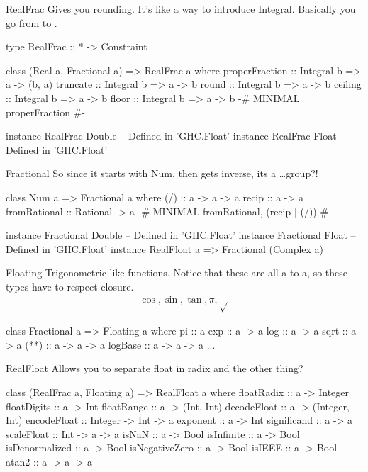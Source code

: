 \documentclass[openany, 11pt]{book}
\begin{document}
\begin{intuition}{RealFrac}{}
	Gives you rounding. It's like a way to introduce Integral.
	Basically you go from  to .
	\begin{haskell}{}
type RealFrac :: * -> Constraint

class (Real a, Fractional a) => RealFrac a where
    properFraction :: Integral b => a -> (b, a)
    truncate :: Integral b => a -> b
    round :: Integral b => a -> b
    ceiling :: Integral b => a -> b
    floor :: Integral b => a -> b
    {-# MINIMAL properFraction #-}

instance RealFrac Double -- Defined in 'GHC.Float’
instance RealFrac Float -- Defined in 'GHC.Float’
\end{haskell}
\end{intuition}

\begin{intuition}{Fractional}{}
	So since it starts with Num, then gets inverse, its a \ldots group?!
	\begin{haskell}{}
class Num a => Fractional a where
    (/) :: a -> a -> a
    recip :: a -> a
    fromRational :: Rational -> a
    {-# MINIMAL fromRational, (recip | (/)) #-}

instance Fractional Double -- Defined in 'GHC.Float’
instance Fractional Float -- Defined in 'GHC.Float’
instance RealFloat a => Fractional (Complex a)
\end{haskell}
\end{intuition}

\begin{intuition}{Floating}{}
	Trigonometric like functions. Notice that these are all a to a, so these
	types have to respect closure.
	\begin{align*}
		\cos, \sin, \tan, \pi, \sqrt{}
	\end{align*}
	\begin{haskell}{}
class Fractional a => Floating a where
    pi :: a
    exp :: a -> a
    log :: a -> a
    sqrt :: a -> a
    (**) :: a -> a -> a
    logBase :: a -> a -> a
    ...
    \end{haskell}
\end{intuition}

\begin{intuition}{RealFloat}{}
	Allows you to separate float in radix and the other thing?

	\begin{haskell}{}
class (RealFrac a, Floating a) => RealFloat a where
  floatRadix :: a -> Integer
  floatDigits :: a -> Int
  floatRange :: a -> (Int, Int)
  decodeFloat :: a -> (Integer, Int)
  encodeFloat :: Integer -> Int -> a
  exponent :: a -> Int
  significand :: a -> a
  scaleFloat :: Int -> a -> a
  isNaN :: a -> Bool
  isInfinite :: a -> Bool
  isDenormalized :: a -> Bool
  isNegativeZero :: a -> Bool
  isIEEE :: a -> Bool
  atan2 :: a -> a -> a
\end{haskell}
\end{intuition}
\end{document}
